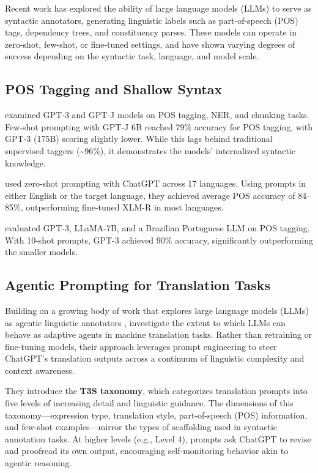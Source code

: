 Recent work has explored the ability of large language models (LLMs) to serve as syntactic annotators, generating linguistic labels such as part-of-speech (POS) tags, dependency trees, and constituency parses. These models can operate in zero-shot, few-shot, or fine-tuned settings, and have shown varying degrees of success depending on the syntactic task, language, and model scale.

\subsection{POS Tagging and Shallow Syntax}

\citet{blevins2023llmpos} examined GPT-3 and GPT-J models on POS tagging, NER, and chunking tasks. Few-shot prompting with GPT-J 6B reached 79\% accuracy for POS tagging, with GPT-3 (175B) scoring slightly lower. While this lags behind traditional supervised taggers (\textasciitilde96\%), it demonstrates the models' internalized syntactic knowledge.

\citet{lai2023chatgptpos} used zero-shot prompting with ChatGPT across 17 languages. Using prompts in either English or the target language, they achieved average POS accuracy of 84--85\%, outperforming fine-tuned XLM-R in most languages.

\citet{machado2024portpos} evaluated GPT-3, LLaMA-7B, and a Brazilian Portuguese LLM on POS tagging. With 10-shot prompts, GPT-3 achieved 90\% accuracy, significantly outperforming the smaller models.

\subsection{Agentic Prompting for Translation Tasks}

Building on a growing body of work that explores large language models (LLMs) as agentic linguistic annotators \citep[e.g.,][]{lai2023chatgptpos, blevins2023llmpos}, \citet{jiao2024gradable} investigate the extent to which LLMs can behave as adaptive agents in machine translation tasks. Rather than retraining or fine-tuning models, their approach leverages prompt engineering to steer ChatGPT's translation outputs across a continuum of linguistic complexity and context awareness.

They introduce the \textbf{T3S taxonomy}, which categorizes translation prompts into five levels of increasing detail and linguistic guidance. The dimensions of this taxonomy—expression type, translation style, part-of-speech (POS) information, and few-shot examples—mirror the types of scaffolding used in syntactic annotation tasks. At higher levels (e.g., Level 4), prompts ask ChatGPT to revise and proofread its own output, encouraging self-monitoring behavior akin to agentic reasoning.

